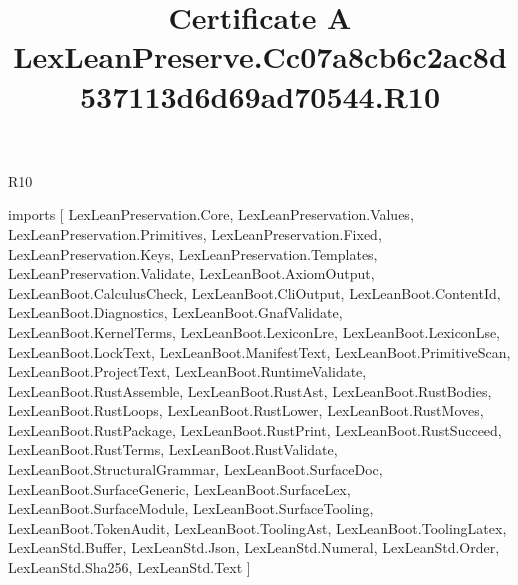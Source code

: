 \begin{lexlean}{R10}
\title{Certificate A LexLeanPreserve.Cc07a8cb6c2ac8d537113d6d69ad70544.R10}
\begin{coremodule}
imports [
  LexLeanPreservation.Core,
  LexLeanPreservation.Values,
  LexLeanPreservation.Primitives,
  LexLeanPreservation.Fixed,
  LexLeanPreservation.Keys,
  LexLeanPreservation.Templates,
  LexLeanPreservation.Validate,
  LexLeanBoot.AxiomOutput,
  LexLeanBoot.CalculusCheck,
  LexLeanBoot.CliOutput,
  LexLeanBoot.ContentId,
  LexLeanBoot.Diagnostics,
  LexLeanBoot.GnafValidate,
  LexLeanBoot.KernelTerms,
  LexLeanBoot.LexiconLre,
  LexLeanBoot.LexiconLse,
  LexLeanBoot.LockText,
  LexLeanBoot.ManifestText,
  LexLeanBoot.PrimitiveScan,
  LexLeanBoot.ProjectText,
  LexLeanBoot.RuntimeValidate,
  LexLeanBoot.RustAssemble,
  LexLeanBoot.RustAst,
  LexLeanBoot.RustBodies,
  LexLeanBoot.RustLoops,
  LexLeanBoot.RustLower,
  LexLeanBoot.RustMoves,
  LexLeanBoot.RustPackage,
  LexLeanBoot.RustPrint,
  LexLeanBoot.RustSucceed,
  LexLeanBoot.RustTerms,
  LexLeanBoot.RustValidate,
  LexLeanBoot.StructuralGrammar,
  LexLeanBoot.SurfaceDoc,
  LexLeanBoot.SurfaceGeneric,
  LexLeanBoot.SurfaceLex,
  LexLeanBoot.SurfaceModule,
  LexLeanBoot.SurfaceTooling,
  LexLeanBoot.TokenAudit,
  LexLeanBoot.ToolingAst,
  LexLeanBoot.ToolingLatex,
  LexLeanStd.Buffer,
  LexLeanStd.Json,
  LexLeanStd.Numeral,
  LexLeanStd.Order,
  LexLeanStd.Sha256,
  LexLeanStd.Text
]


\end{coremodule}
\end{lexlean}
